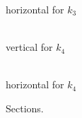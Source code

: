 \documentclass[runningheads,a4paper]{llncs}
\begin{document}
\begin{figure}[htp]
\begin{center}
\begin{minipage}{0.2\linewidth}
horizontal for $k_3$
\end{minipage}
\hfill
\begin{minipage}{0.2\linewidth}
\\
vertical for $k_4$
\end{minipage}
\hfill
\begin{minipage}{0.2\linewidth}
\\
horizontal for $k_4$
\end{minipage}

\caption{Sections.}
\label{fig:4}
  \end{center}
\end{figure}
\end{document}
